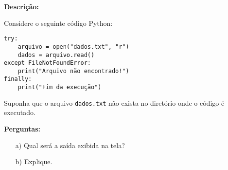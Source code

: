 \textbf{Descrição:}  

Considere o seguinte código Python:

\begin{verbatim}
try:
    arquivo = open("dados.txt", "r")
    dados = arquivo.read()
except FileNotFoundError:
    print("Arquivo não encontrado!")
finally:
    print("Fim da execução")
\end{verbatim}

Suponha que o arquivo \texttt{dados.txt} não exista no diretório onde o código é executado.

\textbf{Perguntas:}

\begin{enumerate}
    \item[a)] Qual será a saída exibida na tela?
    \item[b)] Explique.
\end{enumerate}




